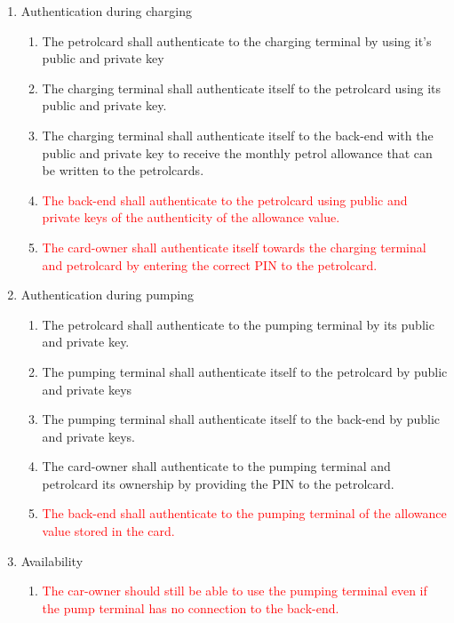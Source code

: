 \begin{enumerate}
\item Authentication during charging
		\begin{enumerate}
		\item The petrolcard shall authenticate to the charging terminal by using it's public and private key%
		\item The charging terminal shall authenticate itself to the petrolcard using its public and private key.
		\item The charging terminal shall authenticate itself to the back-end with the public and private key to receive the monthly petrol allowance that can be written to the petrolcards.
		\item \textcolor{red}{The back-end shall authenticate to the petrolcard using public and private keys of the authenticity of the allowance value.}
		\item \textcolor{red}{The card-owner shall authenticate itself towards the charging terminal and petrolcard by entering the correct PIN to the petrolcard.}
		\end{enumerate}	
		
\item Authentication during pumping
	\begin{enumerate}
	\item The petrolcard shall authenticate to the pumping terminal by its public and private key. %
	\item The pumping terminal shall authenticate itself to the petrolcard by public and private keys
	\item The pumping terminal shall authenticate itself to the back-end by public and private keys.
	\item The card-owner shall authenticate to the pumping terminal and petrolcard its ownership by providing the PIN to the petrolcard.
	\item \textcolor{red}{The back-end shall authenticate to the pumping terminal of the allowance value stored in the card.}
	\end{enumerate}		


\item Availability
	\begin{enumerate}
	\item \textcolor{red}{The car-owner should still be able to use the pumping terminal even if the pump terminal has no connection to the back-end.}
	\end{enumerate}	



\end{enumerate}
